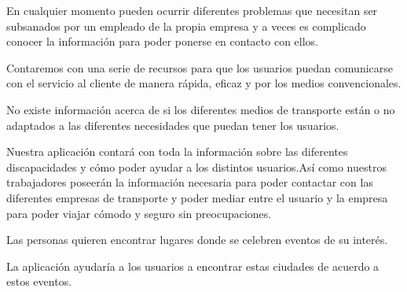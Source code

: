 \begin{problema}

      En cualquier momento pueden ocurrir diferentes problemas que necesitan ser
      subsanados por un empleado de la propia empresa y a veces es complicado conocer
      la información para poder ponerse en contacto con ellos.

            {\centering
                  \begin{vision}\justifying\noindent
                        Contaremos con una serie de recursos para que los usuarios puedan comunicarse con el servicio al cliente de manera rápida, eficaz y por los medios convencionales.
                  \end{vision}}
\end{problema}

\vspace{0.5cm}

\begin{problema}

      No existe información acerca de si los diferentes medios de transporte están o
      no adaptados a las diferentes necesidades que puedan tener los usuarios.

            {\centering
                  \begin{vision}\justifying\noindent
                        Nuestra aplicación contará con toda la información sobre las diferentes discapacidades y cómo poder ayudar a los distintos usuarios.Así como nuestros trabajadores poseerán la información necesaria para poder contactar con las diferentes empresas de transporte y poder mediar entre el usuario y la empresa para poder viajar cómodo y seguro sin preocupaciones.

                  \end{vision}}
\end{problema}

\vspace{0.5cm}

\begin{problema}

      Las personas quieren encontrar lugares donde se celebren eventos de su interés.

      {\centering
      \begin{vision}\justifying\noindent
            La aplicación ayudaría a los usuarios a encontrar estas ciudades de acuerdo a estos eventos.
      \end{vision}}
\end{problema}

